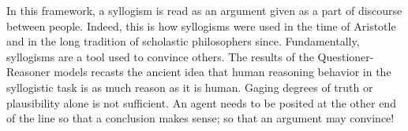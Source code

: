 \documentclass[10pt,letterpaper]{article}
\begin{document}
In this framework, a syllogism is read as an argument given as a part of discourse between people. Indeed, this is how syllogisms were used in the time of Aristotle and in the long tradition of scholastic philosophers since. Fundamentally, syllogisms are a tool used to convince others. The results of the Questioner-Reasoner models recasts the ancient idea that human reasoning behavior in the syllogistic task is as much reason as it is human. Gaging degrees of truth or plausibility alone is not sufficient. An agent needs to be posited at the other end of the line so that a conclusion makes sense; so that an argument may convince!



\setlength{\bibleftmargin}{.125in}
\setlength{\bibindent}{-\bibleftmargin}


\end{document}
